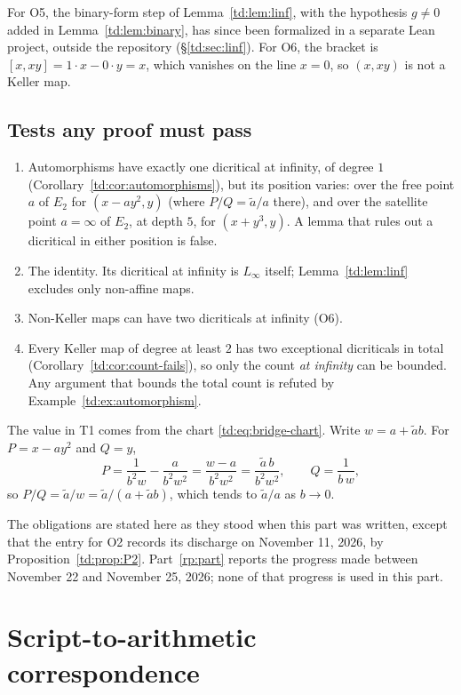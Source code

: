 \documentclass[a4paper,11pt]{article}
\theoremstyle{jsplain}
\theoremstyle{jsdef}
\theoremstyle{jsrem}
\begin{document}
For O5, the binary-form step of Lemma~\ref{td:lem:linf}, with the hypothesis $g \neq 0$ added in
Lemma~\ref{td:lem:binary}, has since been formalized in a separate Lean project, outside the
repository (\S\ref{td:sec:linf}). For O6, the bracket is $[x, xy] = 1 \cdot x - 0 \cdot y = x$, which
vanishes on the line $x = 0$, so $(x, xy)$ is not a Keller map.

\subsection{Tests any proof must pass}

\begin{enumerate}[label=T\arabic*.,leftmargin=*]
\item Automorphisms have exactly one dicritical at infinity, of degree $1$
(Corollary~\ref{td:cor:automorphisms}), but its position varies: over the free point $a$ of
$E_2$ for $(x - a y^2, y)$ (where $P/Q = \tilde{a}/a$ there), and over the satellite point
$a = \infty$ of $E_2$, at depth $5$, for $(x + y^3, y)$. A lemma that rules out a dicritical
in either position is false.
\item The identity. Its dicritical at infinity is $L_\infty$ itself;
Lemma~\ref{td:lem:linf} excludes only non-affine maps.
\item Non-Keller maps can have two dicriticals at infinity (O6).
\item Every Keller map of degree at least $2$ has two exceptional dicriticals in
total (Corollary~\ref{td:cor:count-fails}), so only the count \emph{at infinity} can be
bounded. Any argument that bounds the total count is refuted by Example~\ref{td:ex:automorphism}.
\end{enumerate}

The value in T1 comes from the chart \eqref{td:eq:bridge-chart}. Write $w = a + \tilde a b$. For
$P = x - a y^2$ and $Q = y$,
\[
P = \frac{1}{b^2 w} - \frac{a}{b^2 w^2} = \frac{w - a}{b^2 w^2} = \frac{\tilde a\, b}{b^2 w^2},
\qquad Q = \frac{1}{b\, w},
\]
so $P/Q = \tilde a / w = \tilde a/(a + \tilde a b)$, which tends to $\tilde a/a$ as $b \to 0$.

The obligations are stated here as they stood when this part was written, except that the entry
for O2 records its discharge on November 11, 2026, by Proposition~\ref{td:prop:P2}.
Part~\ref{rp:part} reports the progress made between November 22 and November 25, 2026; none of
that progress is used in this part.

\section{Script-to-arithmetic correspondence}\label{td:sec:correspondence}
\end{document}
